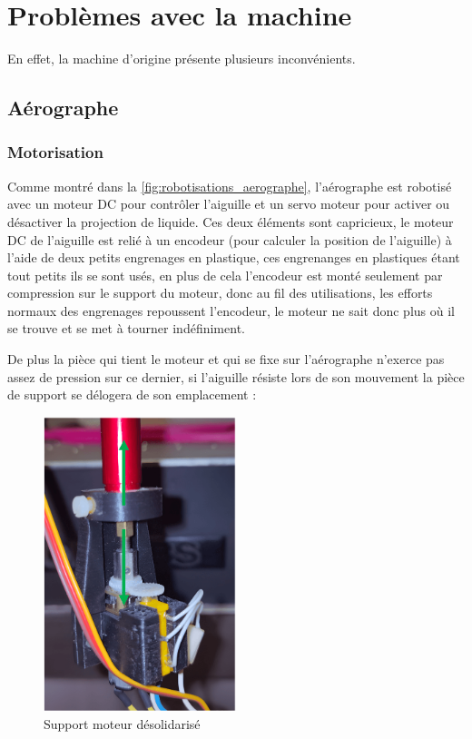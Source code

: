 \newpage
\section{Problèmes avec la machine}
En effet, la machine d'origine présente plusieurs inconvénients.
\subsection{Aérographe}
\subsubsection{Motorisation}
Comme montré dans la \autoref{fig:robotisations_aerographe}, l'aérographe est robotisé avec un moteur DC pour contrôler l'aiguille et un servo moteur pour activer
ou désactiver la projection de liquide. Ces deux éléments sont capricieux, le moteur DC de l'aiguille est relié à un encodeur (pour calculer la position de l'aiguille) à l'aide de deux petits engrenages en
plastique, ces engrenanges en plastiques étant tout petits ils se sont usés, en plus de cela l'encodeur est monté seulement par compression sur le support du moteur, donc au fil des utilisations, les efforts
normaux des engrenages repoussent l'encodeur, le moteur ne sait donc plus où il se trouve et se met à tourner indéfiniment.

De plus la pièce qui tient le moteur et qui se fixe sur l'aérographe n'exerce pas assez de pression sur ce dernier, si l'aiguille résiste lors de son mouvement
la pièce de support se délogera de son emplacement :

\begin{figure}[H]
  \centering
  \includegraphics[width = 0.5\textwidth]{assets/figures/situation_initiale/moteur_desolidarisation_aerographe.png}
  \caption{Support moteur désolidarisé}
\end{figure}


